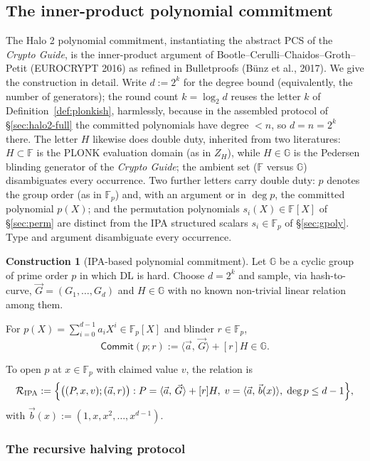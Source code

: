 \documentclass[11pt,a4paper]{article}
\theoremstyle{definition}
\newtheorem{construction}[theorem]{Construction}
\newcommand{\F}{\mathbb{F}}
\newcommand{\G}{\mathbb{G}}
\newcommand{\ip}[2]{\langle #1,\, #2 \rangle}
\newcommand{\Comm}{\mathsf{Commit}}
\newcommand{\Rel}{\mathcal{R}}
\begin{document}
\subsection{The inner-product polynomial commitment}\label{sec:ipa-detail}

The Halo 2 polynomial commitment, instantiating the abstract PCS of
the \emph{Crypto Guide}, is the inner-product argument of
Bootle--Cerulli--Chaidos--Groth--Petit (EUROCRYPT 2016) as refined in
Bulletproofs (B\"unz et al., 2017). We give the construction in detail.
Write $d := 2^k$ for the degree bound (equivalently, the number of
generators); the round count $k = \log_2 d$ reuses the letter $k$ of
Definition~\ref{def:plonkish}, harmlessly, because in the assembled
protocol of \S\ref{sec:halo2-full} the committed polynomials have degree
$< n$, so $d = n = 2^k$ there. The letter $H$ likewise does double duty,
inherited from two literatures: $H \subset \F$ is the PLONK evaluation
domain (as in $Z_H$), while $H \in \G$ is the Pedersen blinding generator
of the \emph{Crypto Guide}; the ambient set ($\F$ versus $\G$)
disambiguates every occurrence. Two further letters carry double duty:
$p$ denotes the group order (as in $\F_p$) and, with an argument or in
$\deg p$, the committed polynomial $p(X)$; and the permutation
polynomials $s_i(X) \in \F[X]$ of \S\ref{sec:perm} are distinct from the
IPA structured scalars $s_i \in \F_p$ of \S\ref{sec:gpoly}. Type and
argument disambiguate every occurrence.

\begin{construction}[IPA-based polynomial commitment]\label{const:ipa}
Let $\G$ be a cyclic group of prime order $p$ in which DL is hard. Choose
$d = 2^k$ and sample, via hash-to-curve, $\vec{G} = (G_1, \dots, G_d)$
and $H \in \G$ with no known non-trivial linear relation among them.

For $p(X) = \sum_{i=0}^{d-1} a_i X^i \in \F_p[X]$ and blinder
$r \in \F_p$,
\[
\Comm(p; r) := \ip{\vec{a}}{\vec{G}} + [r] H \in \G.
\]
\end{construction}

To open $p$ at $x \in \F_p$ with claimed value $v$, the relation is
\[
\Rel_{\mathrm{IPA}} := \Bigl\{\bigl((P, x, v); (\vec{a}, r)\bigr) :
P = \ip{\vec{a}}{\vec{G}} + [r] H,\;
v = \ip{\vec{a}}{\vec{b}(x)},\; \deg p \le d-1\Bigr\},
\]
with $\vec{b}(x) := (1, x, x^2, \dots, x^{d-1})$.

\subsubsection{The recursive halving protocol}
\end{document}
